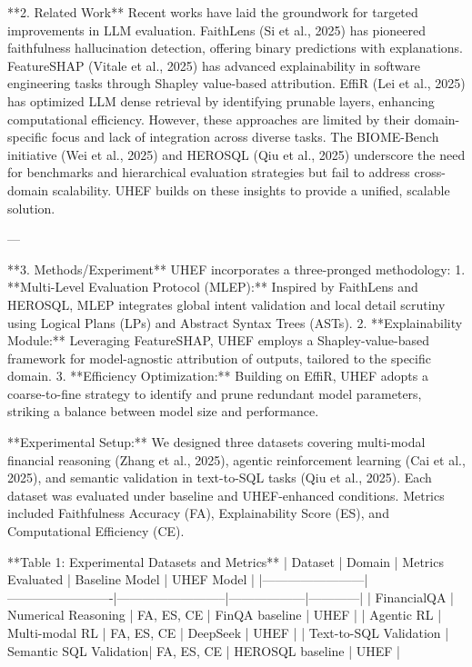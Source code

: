 **2. Related Work**  
Recent works have laid the groundwork for targeted improvements in LLM evaluation. FaithLens (Si et al., 2025) has pioneered faithfulness hallucination detection, offering binary predictions with explanations. FeatureSHAP (Vitale et al., 2025) has advanced explainability in software engineering tasks through Shapley value-based attribution. EffiR (Lei et al., 2025) has optimized LLM dense retrieval by identifying prunable layers, enhancing computational efficiency. However, these approaches are limited by their domain-specific focus and lack of integration across diverse tasks. The BIOME-Bench initiative (Wei et al., 2025) and HEROSQL (Qiu et al., 2025) underscore the need for benchmarks and hierarchical evaluation strategies but fail to address cross-domain scalability. UHEF builds on these insights to provide a unified, scalable solution.

---

**3. Methods/Experiment**  
UHEF incorporates a three-pronged methodology:  
1. **Multi-Level Evaluation Protocol (MLEP):** Inspired by FaithLens and HEROSQL, MLEP integrates global intent validation and local detail scrutiny using Logical Plans (LPs) and Abstract Syntax Trees (ASTs).  
2. **Explainability Module:** Leveraging FeatureSHAP, UHEF employs a Shapley-value-based framework for model-agnostic attribution of outputs, tailored to the specific domain.  
3. **Efficiency Optimization:** Building on EffiR, UHEF adopts a coarse-to-fine strategy to identify and prune redundant model parameters, striking a balance between model size and performance.

**Experimental Setup:**  
We designed three datasets covering multi-modal financial reasoning (Zhang et al., 2025), agentic reinforcement learning (Cai et al., 2025), and semantic validation in text-to-SQL tasks (Qiu et al., 2025). Each dataset was evaluated under baseline and UHEF-enhanced conditions. Metrics included Faithfulness Accuracy (FA), Explainability Score (ES), and Computational Efficiency (CE).  

**Table 1: Experimental Datasets and Metrics**  
| Dataset                | Domain                  | Metrics Evaluated        | Baseline Model   | UHEF Model |  
|------------------------|-------------------------|--------------------------|------------------|------------|  
| FinancialQA            | Numerical Reasoning    | FA, ES, CE               | FinQA baseline   | UHEF       |  
| Agentic RL             | Multi-modal RL         | FA, ES, CE               | DeepSeek         | UHEF       |  
| Text-to-SQL Validation | Semantic SQL Validation| FA, ES, CE               | HEROSQL baseline | UHEF       |  


